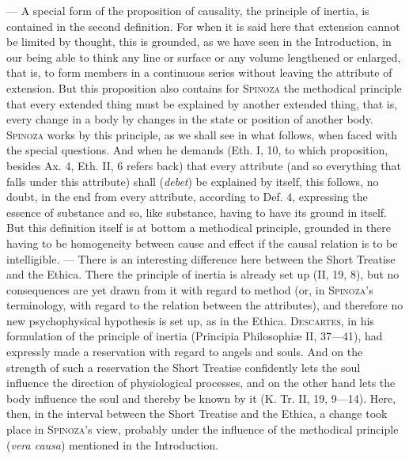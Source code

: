 \documentclass[12pt]{article}
\newcommand{\opage}[1]{\marginnote{\footnotesize\textit{[#1]}}}
\begin{document}
--- A special form of the proposition of causality, the principle of inertia, is
contained in the second definition. For when it is said here that extension cannot be
limited by thought, this is grounded, as we have seen in the Introduction, in our
being able to think any line or surface or any volume lengthened or enlarged, that is,
to form members in a continuous series without leaving the attribute of extension. But
this proposition also contains for \textsc{Spinoza} the methodical principle that
every extended thing must be explained by another extended thing, that is, every
change in a body by changes in the state or position of another body. \textsc{Spinoza}
works by this principle, as we shall see in what follows, when faced with the special
questions. And when he demands (Eth. I, 10, to which proposition, besides Ax. 4, Eth.
II, 6 refers back) that every attribute (and so everything that falls under this
attribute) shall (\textit{debet}) be explained by itself, this follows, no doubt, in
the end from every attribute, according to Def. 4, expressing the essence of substance
and so, like \opage{17}substance, having to have its ground in itself. But this
definition itself is at bottom a methodical principle, grounded in there having to be
homogeneity between cause and effect if the causal relation is to be intelligible. ---
There is an interesting difference here between the Short Treatise and the Ethica.
There the principle of inertia is already set up (II, 19, 8), but no consequences are
yet drawn from it with regard to method (or, in \textsc{Spinoza}'s terminology, with
regard to the relation between the attributes), and therefore no new psychophysical
hypothesis is set up, as in the Ethica. \textsc{Descartes}, in his formulation of the
principle of inertia (Principia Philosophiæ II, 37---41), had expressly made a
reservation with regard to angels and souls. And on the strength of such a reservation
the Short Treatise confidently lets the soul influence the direction of physiological
processes, and on the other hand lets the body influence the soul and thereby be known
by it (K. Tr. II, 19, 9---14). Here, then, in the interval between the Short Treatise
and the Ethica, a change took place in \textsc{Spinoza}'s view, probably under the
influence of the methodical principle (\textit{vera causa}) mentioned in the
Introduction.
\end{document}
